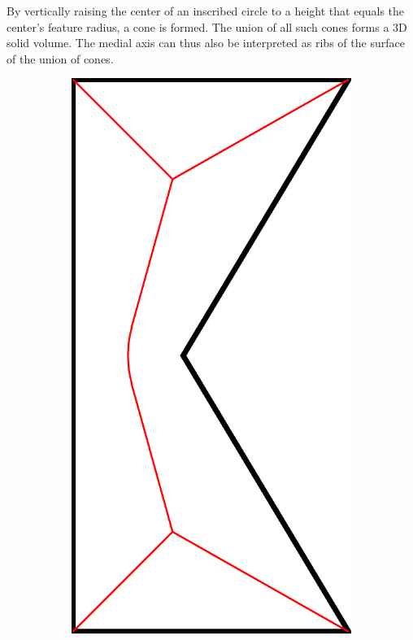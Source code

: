 By vertically raising the center of an inscribed circle to a height that equals the center's feature radius, a cone is formed. 
The union of all such cones forms a 3D solid volume. 
The medial axis can thus also be interpreted as ribs of the surface of the union of cones.~\cite{blum1967transformation}



\begin{figure}\centering
\setlength{\figwidth}{0.19\columnwidth}
\setlength{\figwidthTwo}{0.3\columnwidth}
\begin{subfigure}{\figwidth}\centering
\includegraphics[height=\figwidthTwo]{sources/method/simple_skeleton_mat}

\end{subfigure}
\end{figure}
